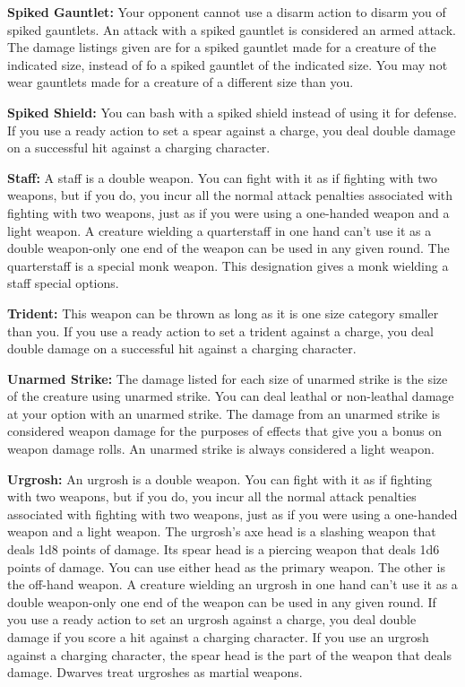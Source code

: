\textbf{Spiked Gauntlet:} Your opponent cannot use a disarm action to disarm you of spiked gauntlets. An attack with a spiked gauntlet is considered an armed attack. The damage listings given are for a spiked gauntlet made for a creature of the indicated size, instead of fo a spiked gauntlet of the indicated size. You may not wear gauntlets made for a creature of a different size than you.

\textbf{Spiked Shield:} You can bash with a spiked shield instead of using it for defense. If you use a ready action to set a spear against a charge, you deal double damage on a successful hit against a charging character.

\textbf{Staff:} A staff is a double weapon. You can fight with it as if fighting with two weapons, but if you do, you incur all the normal attack penalties associated with fighting with two weapons, just as if you were using a one-handed weapon and a light weapon. A creature wielding a quarterstaff in one hand can't use it as a double weapon-only one end of the weapon can be used in any given round. The quarterstaff is a special monk weapon. This designation gives a monk wielding a staff special options.

\textbf{Trident:} This weapon can be thrown as long as it is one size category smaller than you. If you use a ready action to set a trident against a charge, you deal double damage on a successful hit against a charging character.

\textbf{Unarmed Strike:} The damage listed for each size of unarmed strike is the size of the creature using unarmed strike. You can deal leathal or non-leathal damage at your option with an unarmed strike. The damage from an unarmed strike is considered weapon damage for the purposes of effects that give you a bonus on weapon damage rolls. An unarmed strike is always considered a light weapon.

\textbf{Urgrosh:} An urgrosh is a double weapon. You can fight with it as if fighting with two weapons, but if you do, you incur all the normal attack penalties associated with fighting with two weapons, just as if you were using a one-handed weapon and a light weapon. The urgrosh's axe head is a slashing weapon that deals 1d8 points of damage. Its spear head is a piercing weapon that deals 1d6 points of damage. You can use either head as the primary weapon. The other is the off-hand weapon. A creature wielding an urgrosh in one hand can't use it as a double weapon-only one end of the weapon can be used in any given round. If you use a ready action to set an urgrosh against a charge, you deal double damage if you score a hit against a charging character. If you use an urgrosh against a charging character, the spear head is the part of the weapon that deals damage. Dwarves treat urgroshes as martial weapons.

